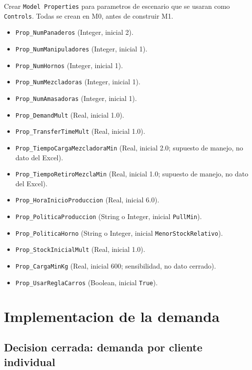 \documentclass[11pt]{article}
\newcommand{\simio}[1]{\texttt{#1}}
\newcommand{\state}[1]{\texttt{#1}}
\begin{document}
Crear \simio{Model Properties} para parametros de escenario que se usaran como \simio{Controls}. Todas se crean en M0, antes de construir M1.
\vspace{-2mm}
\begin{itemize}
  \item \state{Prop\_NumPanaderos} (Integer, inicial 2).
  \item \state{Prop\_NumManipuladores} (Integer, inicial 1).
  \item \state{Prop\_NumHornos} (Integer, inicial 1).
  \item \state{Prop\_NumMezcladoras} (Integer, inicial 1).
  \item \state{Prop\_NumAmasadoras} (Integer, inicial 1).
  \item \state{Prop\_DemandMult} (Real, inicial 1.0).
  \item \state{Prop\_TransferTimeMult} (Real, inicial 1.0).
  \item \state{Prop\_TiempoCargaMezcladoraMin} (Real, inicial 2.0; supuesto de manejo, no dato del Excel).
  \item \state{Prop\_TiempoRetiroMezclaMin} (Real, inicial 1.0; supuesto de manejo, no dato del Excel).
  \item \state{Prop\_HoraInicioProduccion} (Real, inicial 6.0).
  \item \state{Prop\_PoliticaProduccion} (String o Integer, inicial \simio{PullMin}).
  \item \state{Prop\_PoliticaHorno} (String o Integer, inicial \simio{MenorStockRelativo}).
  \item \state{Prop\_StockInicialMult} (Real, inicial 1.0).
  \item \state{Prop\_CargaMinKg} (Real, inicial 600; sensibilidad, no dato cerrado).
  \item \state{Prop\_UsarReglaCarros} (Boolean, inicial \simio{True}).
\end{itemize}

\section{Implementacion de la demanda}

\subsection{Decision cerrada: demanda por cliente individual}
\end{document}
